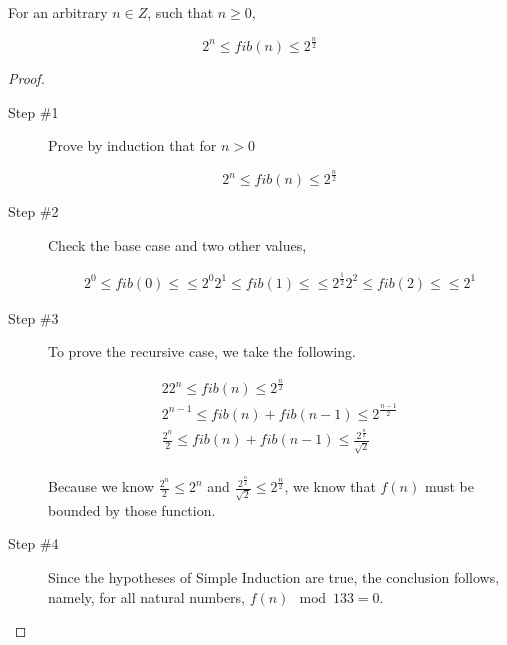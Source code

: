 \documentclass[12pt]{scrartcl}
\begin{document}
\problem{}
\begin{theorem}
    For an arbitrary $n \in Z$, such that $n \geq 0$,

    \begin{equation*}
        2^n \leq fib(n) \leq 2^\frac{n}{2}
    \end{equation*}
\end{theorem}

\begin{proof}
    \begin{description}
        \item[Step \#1] Prove by induction that for $n > 0$

            \begin{equation*}
                2^n \leq fib(n) \leq 2^\frac{n}{2}
            \end{equation*}


        \item[Step \#2] Check the base case and two other values,

           \begin{align*}
               2^0 \leq fib(0) \leq \leq 2^0
               2^1 \leq fib(1) \leq \leq 2^\frac{1}{2}
               2^2 \leq fib(2) \leq \leq 2^1
           \end{align*}

       \item[Step \#3] To prove the recursive case, we take the following.

           \begin{alignat*}{2}
                2^n \leq fib(n) \leq 2^\frac{n}{2} \\
                2^{n - 1} \leq fib(n) + fib(n-1) \leq 2^\frac{n - 1}{2} \\
                \frac{2^n}{2} \leq fib(n) + fib(n-1) \leq \frac{2^\frac{n}{2}}{\sqrt{2}} \\
           \end{alignat*}

           Because we know $ \frac{2^n}{2} \leq 2^n$ and $\frac{2^{\frac{n}{2}}}{\sqrt{2}} \leq 2^\frac{n}{2}$, we know that $f(n)$ must be bounded by those function.

       \item[Step \#4]  Since the hypotheses of Simple Induction are true, the conclusion follows, namely, for all natural numbers, $f(n) \mod 133 = 0$.
    \end{description}
\end{proof}
\end{document}
